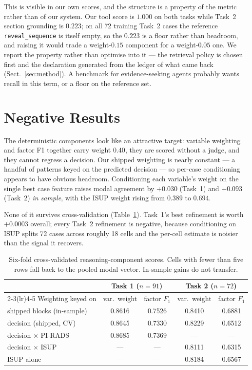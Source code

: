 \documentclass[runningheads]{llncs}
\newcommand{\code}[1]{\texttt{\small #1}}
\begin{document}
This is visible in our own scores, and the structure is a property of the metric
rather than of our system. Our tool score is $1.000$ on both tasks while Task~2
section grounding is $0.223$; on all 72 training Task~2 cases the reference
\code{reveal\_sequence} is itself empty, so the $0.223$ is a floor rather than
headroom, and raising it would trade a weight-$0.15$ component for a weight-$0.05$
one. We report the property rather than optimise into it --- the retrieval policy
is chosen first and the declaration generated from the ledger of what came back
(Sect.~\ref{sec:method}). A benchmark for evidence-seeking agents probably wants
recall in this term, or a floor on the reference set.

\section{Negative Results}
\label{sec:negative}

The deterministic components look like an attractive target: variable weighting and
factor F1 together carry weight $0.40$, they are scored without a judge, and they
cannot regress a decision. Our shipped weighting is nearly constant --- a handful of
patterns keyed on the predicted decision --- so per-case conditioning appears to
have obvious headroom. Conditioning each variable's weight on the single best case
feature raises modal agreement by $+0.030$ (Task~1) and $+0.093$ (Task~2)
\emph{in sample}, with the ISUP weight rising from $0.389$ to $0.694$.

None of it survives cross-validation (Table~\ref{tab:cv}). Task~1's best refinement
is worth $+0.0003$ overall; every Task~2 refinement is negative, because
conditioning on ISUP splits 72 cases across roughly 18 cells and the per-cell
estimate is noisier than the signal it recovers.

\begin{table}[t]
\caption{Six-fold cross-validated reasoning-component scores. Cells with fewer than
five rows fall back to the pooled modal vector. In-sample gains do not transfer.}
\label{tab:cv}
\centering
\begin{tabular}{lcccc}
\toprule
& \multicolumn{2}{c}{Task 1 ($n{=}91$)} & \multicolumn{2}{c}{Task 2 ($n{=}72$)} \\
\cmidrule(lr){2-3}\cmidrule(lr){4-5}
Weighting keyed on & var.\ weight & factor $F_1$ & var.\ weight & factor $F_1$ \\
\midrule
shipped blocks (in-sample)  & 0.8616 & 0.7526 & 0.8410 & 0.6881 \\
decision (shipped, CV)      & 0.8645 & 0.7330 & 0.8229 & 0.6512 \\
decision $\times$ PI-RADS   & 0.8685 & 0.7369 & --- & --- \\
decision $\times$ ISUP      & --- & --- & 0.8111 & 0.6315 \\
ISUP alone                  & --- & --- & 0.8184 & 0.6567 \\
\bottomrule
\end{tabular}
\end{table}
\end{document}
